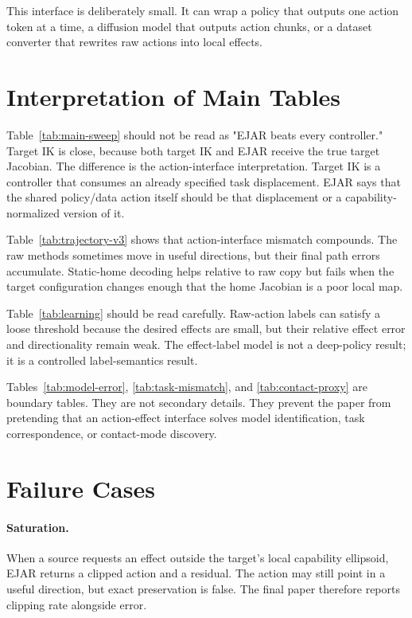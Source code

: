 \documentclass{article}
\begin{document}
This interface is deliberately small. It can wrap a policy that outputs one action token at a time, a diffusion model that outputs action chunks, or a dataset converter that rewrites raw actions into local effects.

\section{Interpretation of Main Tables}

Table~\ref{tab:main-sweep} should not be read as "EJAR beats every controller." Target IK is close, because both target IK and EJAR receive the true target Jacobian. The difference is the action-interface interpretation. Target IK is a controller that consumes an already specified task displacement. EJAR says that the shared policy/data action itself should be that displacement or a capability-normalized version of it.

Table~\ref{tab:trajectory-v3} shows that action-interface mismatch compounds. The raw methods sometimes move in useful directions, but their final path errors accumulate. Static-home decoding helps relative to raw copy but fails when the target configuration changes enough that the home Jacobian is a poor local map.

Table~\ref{tab:learning} should be read carefully. Raw-action labels can satisfy a loose threshold because the desired effects are small, but their relative effect error and directionality remain weak. The effect-label model is not a deep-policy result; it is a controlled label-semantics result.

Tables~\ref{tab:model-error}, \ref{tab:task-mismatch}, and \ref{tab:contact-proxy} are boundary tables. They are not secondary details. They prevent the paper from pretending that an action-effect interface solves model identification, task correspondence, or contact-mode discovery.

\clearpage
\section{Failure Cases}

\paragraph{Saturation.}
When a source requests an effect outside the target's local capability ellipsoid, EJAR returns a clipped action and a residual. The action may still point in a useful direction, but exact preservation is false. The final paper therefore reports clipping rate alongside error.
\end{document}
